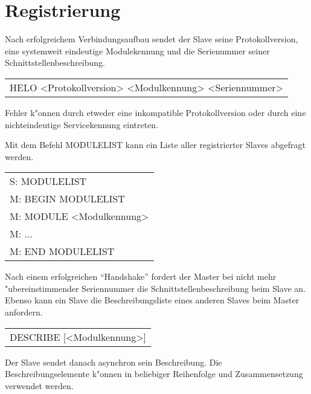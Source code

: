 \section{Registrierung}
Nach erfolgreichem Verbindungsaufbau sendet der Slave seine Protokollversion,
eine systemweit eindeutige Modulekennung und die Serienummer seiner Schnittstellenbeschreibung.

\begin{center}
\begin{tabular*}{350pt}{l}
HELO <Protokollversion> <Modulkennung> <Seriennummer>\\
\end{tabular*}
\end{center}

Fehler k"onnen durch etweder eine inkompatible Protokollversion oder durch eine nichteindeutige 
Servicekennung eintreten. 

Mit dem Befehl MODULELIST kann ein Liste aller registrierter Slaves abgefragt werden.

\begin{center}
\begin{tabular*}{350pt}{l}
S: MODULELIST \\
M: BEGIN MODULELIST \\
M: MODULE <Modulkennung>\\
M: ...\\
M: END MODULELIST\\
\end{tabular*}
\end{center}

Nach einem erfolgreichen ``Handshake'' fordert der Master bei nicht mehr "ubereinstimmender 
Seriennummer die Schnittstellenbeschreibung beim Slave an. Ebenso kann ein Slave die Beschreibungsliste
eines anderen Slaves beim Master anfordern.

\begin{center}
\begin{tabular*}{350pt}{l}
DESCRIBE [<Modulkennung>]\\ 
\end{tabular*}
\end{center}

Der Slave sendet danach asynchron sein Beschreibung. Die Beschreibungselemente k"onnen 
in beliebiger Reihenfolge und Zusammensetzung verwendet werden.

